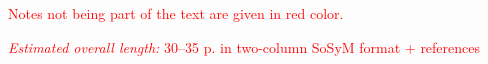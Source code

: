 \documentclass[twocolumn]{svjour3}          %
\newcommand{\NOTE}[1]{\textcolor{red}{#1}}
\begin{document}


\date{Received: date / Accepted: date}

\maketitle




\NOTE{Notes not being part of the text are given in red color.}

\NOTE{\emph{Estimated overall length:} 30--35 p. in two-column SoSyM format + references}

\clearpage






















\end{document}
